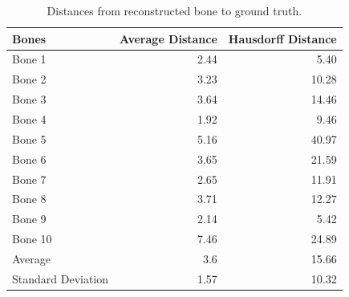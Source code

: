 \begin{table}
\centering
\caption{Distances from reconstructed bone to ground truth.}
\label{tbl:reconstructed_distance}
\begin{tabular}{lrr}
\toprule
\textbf{Bones} &
Average Distance &
Hausdorff Distance \\
\midrule
Bone 1& 2.44 & 5.40 \\
Bone 2& 3.23 & 10.28 \\
Bone 3& 3.64 & 14.46 \\
Bone 4& 1.92 & 9.46 \\
Bone 5& 5.16 & 40.97 \\
Bone 6& 3.65 & 21.59 \\
Bone 7& 2.65 & 11.91 \\
Bone 8& 3.71 & 12.27 \\
Bone 9& 2.14 & 5.42 \\
Bone 10& 7.46 & 24.89 \\
\midrule
Average& 3.6 & 15.66 \\
Standard Deviation& 1.57 & 10.32 \\
\bottomrule
\end{tabular}
\end{table}